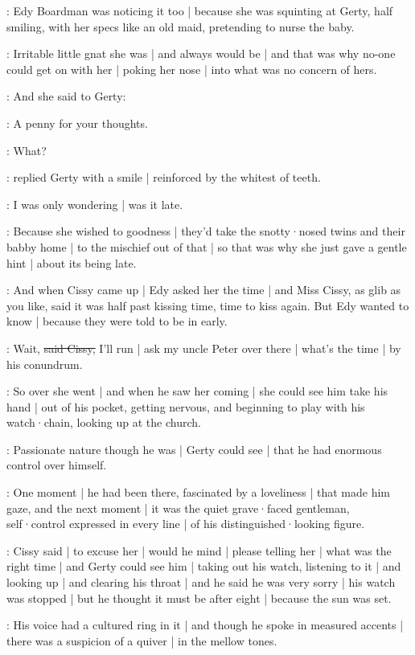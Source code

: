 :
Edy Boardman was noticing it too |
because she was squinting at Gerty,
half smiling,
with her specs
like an old maid,
pretending to nurse the baby.

\gertyJudgy:
Irritable little gnat she was |
and always would be |
and that was why no-one could get on with her |
poking her nose |
into what was no concern of hers.

:
And she said to Gerty:

\edy:
A penny for your thoughts.

\gerty:
What?

:
replied Gerty
with a smile |
reinforced by the whitest of teeth.

\gerty:
I was only wondering |
was it late.

\gertyJudgy:
Because she wished to goodness |
they'd take the snotty·nosed twins and their babby home |
to the mischief
out of that |%
so that was
why she just gave a gentle hint |
about its being late.

:
And when Cissy came up |
Edy asked her the time |
and Miss Cissy,
as glib as you like,
said it was half past kissing time,
time to kiss again.
But Edy wanted to know |
because they were told
to be in early.

\cissy:
Wait,
\sout{said Cissy,}
I'll run |
ask my uncle Peter over there |
what's the time |
by his conundrum.

:
So over she went |
and when he saw her coming |
she could see him take his hand |
out of his pocket,
getting nervous,
and beginning to play with his watch·chain,
looking up at the church.

\gertySex:
Passionate nature though he was |
Gerty could see |
that he had enormous control over himself.%

\gertyNovel:
One moment |
he had been there,
fascinated by a loveliness |
that made him gaze,
and the next moment |
it was the quiet grave·faced gentleman,
self·control expressed in every line |
of his distinguished·looking figure.

:
Cissy said |
to excuse her |
would he mind |
please telling her |
what was the right time |
and Gerty could see him |
taking out his watch,
listening to it |
and looking up |
and clearing his throat |
and he said he was very sorry |
his watch was stopped |
but he thought it must be after eight |
because the sun was set.

\gertyRomantic:
His voice had a cultured ring in it |
and though he spoke in measured accents |
there was a suspicion of a quiver |
in the mellow tones.

